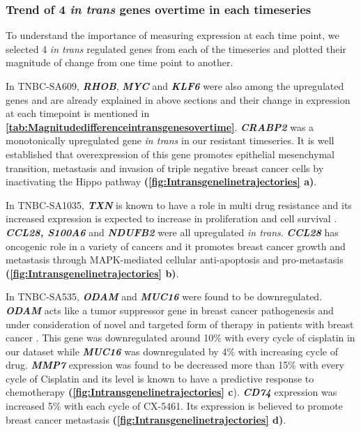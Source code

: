 
 \subsubsection{Trend of 4 \textit{in trans} genes overtime in each timeseries}

To understand the importance of measuring expression at each time point, we selected 4 \textit{in trans} regulated genes from each of the timeseries and plotted their magnitude of change from one time point to another.

In TNBC-SA609, \textit{\textbf{RHOB}}, \textit{\textbf{MYC}} and \textit{\textbf{KLF6}} were also among the upregulated genes and are already explained in above sections and their change in expression at each timepoint is mentioned in \textbf{\autoref{tab:Magnitudedifferenceintransgenesovertime}}.  \textit{\textbf{CRABP2}} was a monotonically upregulated gene \textit{in trans} in our resistant timeseries. It is well established that overexpression of this gene promotes epithelial mesenchymal transition, metastasis and invasion of triple negative breast cancer cells by inactivating the Hippo pathway \cite{feng2019crabp2} \textbf{(\autoref{fig:Intransgenelinetrajectories} a)}.

In TNBC-SA1035, \textit{\textbf{TXN}} is known to have a role in multi drug resistance and its increased expression is expected to increase in proliferation and cell survival \cite{mieszala2018expression, powis2000role}.
\textit{\textbf{CCL28, S100A6}} and \textit{\textbf{NDUFB2}} were all upregulated \textit{in trans}. \textit{\textbf{CCL28}} has oncogenic role in a variety of cancers and it promotes breast cancer growth and metastasis through MAPK-mediated cellular anti-apoptosis and pro-metastasis \cite{yang2017ccl28, lin2013ccl28} \textbf{(\autoref{fig:Intransgenelinetrajectories} b)}. 

In TNBC-SA535, \textit{\textbf{ODAM}} and \textit{\textbf{MUC16}} were found to be downregulated. \textit{\textbf{ODAM}} acts like a tumor suppressor gene in breast cancer pathogenesis and under consideration of novel and targeted form of therapy in patients with breast cancer  \cite{kestler2011odam, foster2013odontogenic}. This gene was downregulated around 10\% with every cycle of cisplatin in our dataset while \textit{\textbf{MUC16}} was downregulated by 4\% with increasing cycle of drug. \textit{\textbf{MMP7}} expression was found to be decreased more than 15\% with every cycle of Cisplatin and its level is known to have a predictive response to chemotherapy \cite{liu2008predictive} \textbf{(\autoref{fig:Intransgenelinetrajectories} c}).  \textit{\textbf{CD74}} expression was increased 5\% with each cycle of CX-5461. Its expression is believed to promote breast cancer metastasis \cite{otterstrom2014cd74, gai2018expression, wang2017cd74} \textbf{(\autoref{fig:Intransgenelinetrajectories} d)}.


